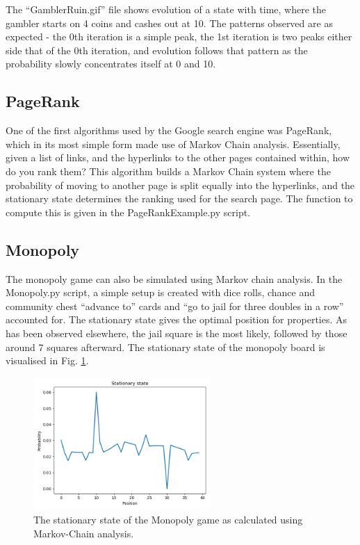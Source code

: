 \documentclass[12pt]{article}
\begin{document}
The ``GamblerRuin.gif'' file shows evolution of a state with time, where the gambler starts on 4 coins and cashes out at 10. 
The patterns observed are as expected - the 0th iteration is a simple peak, the 1st iteration is two peaks either side that of the 0th iteration, and evolution follows that pattern as the probability slowly concentrates itself at 0 and 10.

\subsection{PageRank}

One of the first algorithms used by the Google search engine was PageRank, which in its most simple form made use of Markov Chain analysis.
Essentially, given a list of links, and the hyperlinks to the other pages contained within, how do you rank them?
This algorithm builds a Markov Chain system where the probability of moving to another page is split equally into the hyperlinks, and the stationary state determines the ranking used for the search page.
The function to compute this is given in the PageRankExample.py script.

\subsection{Monopoly}

The monopoly game can also be simulated using Markov chain analysis. In the Monopoly.py script, a simple setup is created with dice rolls, chance and community chest ``advance to'' cards and ``go to jail for three doubles in a row'' accounted for. The stationary state gives the optimal position for properties.
As has been observed elsewhere, the jail square is the most likely, followed by those around 7 squares afterward.
The stationary state of the monopoly board is visualised in Fig. \ref{fig:monopoly}.

\begin{figure}
        \centering
        \includegraphics[width=0.6\textwidth]{MonopolyStationary.png}
	\caption{The stationary state of the Monopoly game as calculated using Markov-Chain analysis.}
	\label{fig:monopoly}
\end{figure}
\end{document}
